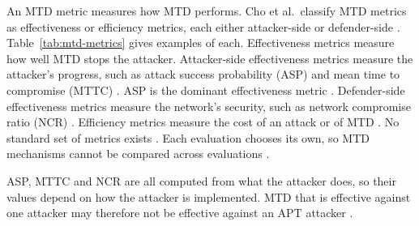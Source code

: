 \documentclass{cshonours}
\begin{document}
An MTD metric measures how MTD performs. Cho et al.\ classify MTD metrics
as effectiveness or efficiency metrics, each either attacker-side or
defender-side \citep{cho2020}. Table~\ref{tab:mtd-metrics} gives examples of
each. Effectiveness metrics measure how well MTD stops the attacker.
Attacker-side effectiveness metrics measure the attacker's progress, such
as attack success probability (ASP) and mean time to compromise (MTTC)
\citep{cho2020}. ASP is the dominant effectiveness metric \citep{cho2020}.
Defender-side effectiveness metrics measure the network's security, such
as network compromise ratio (NCR) \citep{zhang2023}. Efficiency metrics
measure the cost of an attack or of MTD \citep{cho2020}. No standard set
of metrics exists \citep{cho2020, jalowski2026}. Each evaluation chooses its own, so MTD
mechanisms cannot be compared across evaluations \citep{jalowski2026}.

ASP, MTTC and NCR are all computed from what the attacker does, so their
values depend on how the attacker is implemented. MTD that
is effective against one attacker may therefore not be effective against an
APT attacker \citep{hong2018}.
\end{document}
